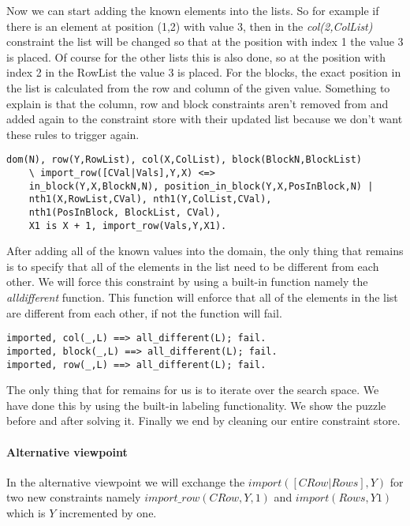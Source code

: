 Now we can start adding the known elements into the lists.
So for example if there is an element at position (1,2) with value 3, then in the \textsl{col(2,ColList)} constraint the list will be changed so that at the position with index 1 the value 3 is placed.
Of course for the other lists this is also done, so at the position with index 2 in the RowList the value 3 is placed.
For the blocks, the exact position in the list is calculated from the row and column of the given value.
Something to explain is that the column, row and block constraints aren't removed from and added again to the constraint store with their updated list because we don't want these rules to trigger again.

\begin{lstlisting}
dom(N), row(Y,RowList), col(X,ColList), block(BlockN,BlockList) 
	\ import_row([CVal|Vals],Y,X) <=>
	in_block(Y,X,BlockN,N), position_in_block(Y,X,PosInBlock,N) | 
	nth1(X,RowList,CVal), nth1(Y,ColList,CVal), 
	nth1(PosInBlock, BlockList, CVal), 
	X1 is X + 1, import_row(Vals,Y,X1).
\end{lstlisting}

After adding all of the known values into the domain, the only thing that remains is to specify that all of the elements in the list need to be different from each other.
We will force this constraint by using a built-in function namely the \textsl{alldifferent} function.
This function will enforce that all of the elements in the list are different from each other, if not the function will fail.

\begin{lstlisting}
imported, col(_,L) ==> all_different(L); fail.
imported, block(_,L) ==> all_different(L); fail.
imported, row(_,L) ==> all_different(L); fail.
\end{lstlisting}

The only thing that for remains for us is to iterate over the search space. We have done this by using the built-in labeling functionality. We show the puzzle before and after solving it.
Finally we end by cleaning our entire constraint store.

\paragraph*{Alternative viewpoint}
In the alternative viewpoint we will exchange the \textsl{$import([CRow|Rows],Y)$} for two new constraints namely \textsl{$import\_row(CRow,Y,1)$} and \textsl{$import(Rows,Y1)$} which is $Y$ incremented by one.

